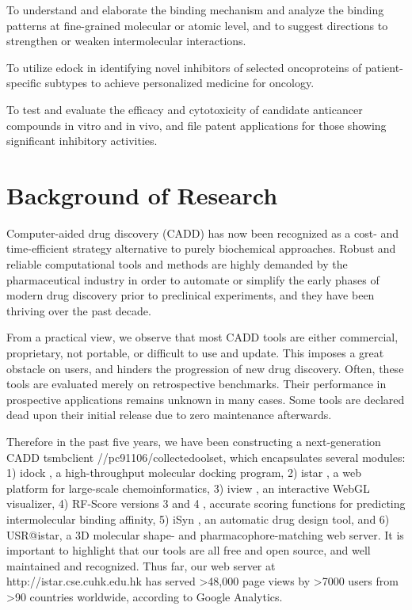 \documentclass[a4paper,12pt]{article}
\begin{document}
To understand and elaborate the binding mechanism and analyze the binding patterns at fine-grained molecular or atomic level, and to suggest directions to strengthen or weaken intermolecular interactions.

To utilize edock in identifying novel inhibitors of selected oncoproteins of patient-specific subtypes to achieve personalized medicine for oncology.

To test and evaluate the efficacy and cytotoxicity of candidate anticancer compounds in vitro and in vivo, and file patent applications for those showing significant inhibitory activities.

\section*{Background of Research}

Computer-aided drug discovery (CADD) has now been recognized as a cost- and time-efficient strategy alternative to purely biochemical approaches. Robust and reliable computational tools and methods are highly demanded by the pharmaceutical industry in order to automate or simplify the early phases of modern drug discovery prior to preclinical experiments, and they have been thriving over the past decade.

From a practical view, we observe that most CADD tools are either commercial, proprietary, not portable, or difficult to use and update. This imposes a great obstacle on users, and hinders the progression of new drug discovery. Often, these tools are evaluated merely on retrospective benchmarks. Their performance in prospective applications remains unknown in many cases. Some tools are declared dead upon their initial release due to zero maintenance afterwards.

Therefore in the past five years, we have been constructing a next-generation CADD tsmbclient //pc91106/collectedoolset, which encapsulates several modules: 1) idock \citep{1153}, a high-throughput molecular docking program, 2) istar \citep{1362}, a web platform for large-scale chemoinformatics, 3) iview \citep{1366,1265}, an interactive WebGL visualizer, 4) RF-Score versions 3 and 4 \citep{1432,1647,1434,1663}, accurate scoring functions for predicting intermolecular binding affinity, 5) iSyn \citep{1409,1387}, an automatic drug design tool, and 6) USR@istar, a 3D molecular shape- and pharmacophore-matching web server. It is important to highlight that our tools are all free and open source, and well maintained and recognized. Thus far, our web server at http://istar.cse.cuhk.edu.hk has served \textgreater48,000 page views by \textgreater7000 users from \textgreater90 countries worldwide, according to Google Analytics.
\end{document}
